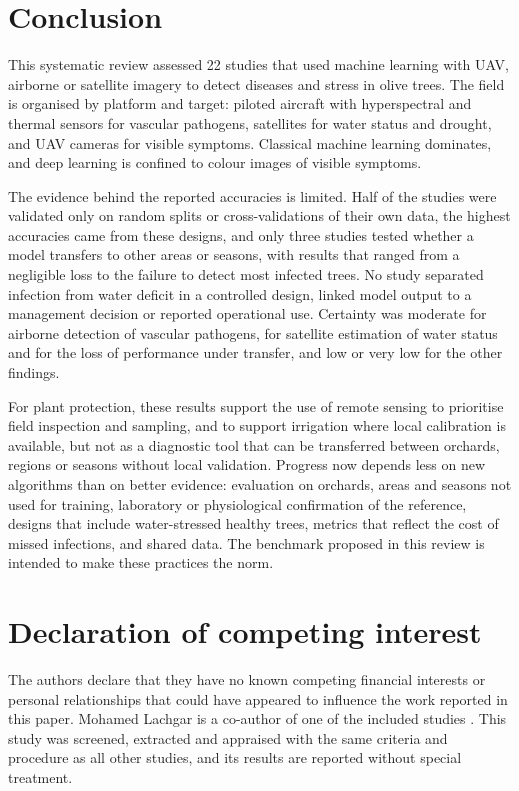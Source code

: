 \documentclass[preprint,12pt]{elsarticle}
\begin{document}
\section{Conclusion}\label{sec:conclusion}
This systematic review assessed 22 studies that used machine learning with UAV, airborne or satellite imagery to detect diseases and stress in olive trees. The field is organised by platform and target: piloted aircraft with hyperspectral and thermal sensors for vascular pathogens, satellites for water status and drought, and UAV cameras for visible symptoms. Classical machine learning dominates, and deep learning is confined to colour images of visible symptoms.

The evidence behind the reported accuracies is limited. Half of the studies were validated only on random splits or cross-validations of their own data, the highest accuracies came from these designs, and only three studies tested whether a model transfers to other areas or seasons, with results that ranged from a negligible loss to the failure to detect most infected trees. No study separated infection from water deficit in a controlled design, linked model output to a management decision or reported operational use. Certainty was moderate for airborne detection of vascular pathogens, for satellite estimation of water status and for the loss of performance under transfer, and low or very low for the other findings.

For plant protection, these results support the use of remote sensing to prioritise field inspection and sampling, and to support irrigation where local calibration is available, but not as a diagnostic tool that can be transferred between orchards, regions or seasons without local validation. Progress now depends less on new algorithms than on better evidence: evaluation on orchards, areas and seasons not used for training, laboratory or physiological confirmation of the reference, designs that include water-stressed healthy trees, metrics that reflect the cost of missed infections, and shared data. The benchmark proposed in this review is intended to make these practices the norm.

\section*{Declaration of competing interest}
The authors declare that they have no known competing financial interests or personal relationships that could have appeared to influence the work reported in this paper. Mohamed Lachgar is a co-author of one of the included studies \citep{u080}. This study was screened, extracted and appraised with the same criteria and procedure as all other studies, and its results are reported without special treatment.
\end{document}
